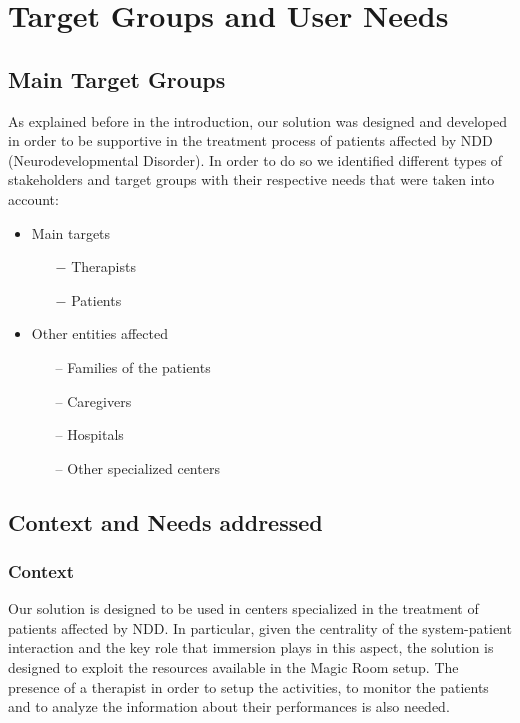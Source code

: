 \chapter{Target Groups and User Needs}
\section{Main Target Groups}
As explained before in the introduction, our solution was designed and developed in order to be supportive in the treatment process of patients affected by NDD (Neurodevelopmental Disorder). In order to do so we identified different types of stakeholders and target groups with their respective needs that were taken into account:
\begin{itemize}
	\item Main targets
	\begin{itemize}
		\item[$ - $] Therapists
		\item[$ - $] Patients
	\end{itemize}
\end{itemize}
\begin{itemize}
		\item Other entities affected
	\begin{itemize}
		\item[--] Families of the patients
		\item[--] Caregivers
		\item[--] Hospitals
		\item[--] Other specialized centers
	\end{itemize}
\end{itemize}

\section{Context and Needs addressed}
	\subsection{Context}
	Our solution is designed to be used in centers specialized in the treatment of patients affected by NDD. In particular, given the centrality of the system-patient interaction and the key role that immersion plays in this aspect, the solution is designed to exploit the resources available in the Magic Room setup. The presence of a therapist in order to setup the activities, to monitor the patients and to analyze the information about their performances is also needed.
	
